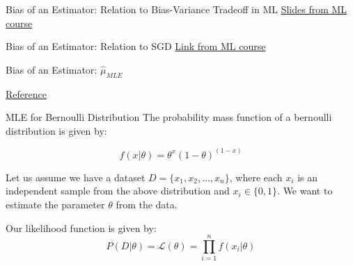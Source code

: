\documentclass[handout]{beamer}
\begin{document}
\begin{frame}{Bias of an Estimator: Relation to Bias-Variance Tradeoff in ML}
    \href{https://nipunbatra.github.io/ml2023/lectures/cross-validation.pdf}{Slides from ML course}
\end{frame}

\begin{frame}{Bias of an Estimator: Relation to SGD}
    \href{https://florian.github.io/estimators/}{Link from ML course}
\end{frame}

    
\begin{frame}{Bias of an Estimator: $\hat{\mu}_{MLE}$}

    \href{https://online.stat.psu.edu/stat415/lesson/1/1.3}{Reference}
        
    
    

    
\end{frame}
\begin{frame}{MLE for Bernoulli Distribution}
    The probability mass function of a bernoulli distribution is given by:
    
    \begin{equation}
    f(x|\theta) = \theta^x(1-\theta)^{(1-x)}
    \end{equation}
    
    Let us assume we have a dataset $D = \{x_1, x_2, \ldots, x_n\}$, where each $x_i$ is an independent sample from the above distribution and $x_i\in\{0, 1\}$.
    We want to estimate the parameter $\theta$ from the data.
    
    Our likelihood function is given by:
    \begin{equation}
    P(D|\theta) = \mathcal{L}(\theta) = \prod_{i=1}^n f(x_i|\theta)
    \end{equation}
    \end{frame}
\end{document}
